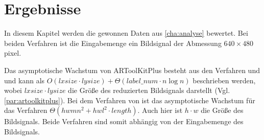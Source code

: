 \chapter{Ergebnisse} %
\label{cha:ergebnisse}
\begin{comment}
	Ergebnisse: Die gewonnen Daten aus Kap. Analyse bewerten.
\end{comment}

In diesem Kapitel werden die gewonnen Daten aus \autoref{cha:analyse} bewertet. Bei beiden Verfahren ist die Eingabemenge ein Bildsignal der Abmessung $640 \times 480$ \gls{pixel}.

Das asymptotische Wachstum von ARToolKitPlus besteht aus den Verfahren  und
  und kann als $O(\mathit{lxsize}\cdot\mathit{lysize})
 + \Theta(\mathit{label\_num}\cdot n \log n)$ beschrieben werden, wobei $\mathit{lxsize}\cdot\mathit{lysize}$ die Größe
 des reduzierten Bildsignals darstellt (Vgl. \autoref{par:artoolkitplus}). Bei dem Verfahren von
 \citeauthor{hirzer08} ist das asymptotische Wachstum für das Verfahren 
 $\Theta(hwmn^2+hwl^2\cdot\mathit{length})$. Auch hier ist $h \cdot w$ die Größe des Bildsignals.
Beide Verfahren sind somit abhängig von der Eingabemenge des Bildsignals.

